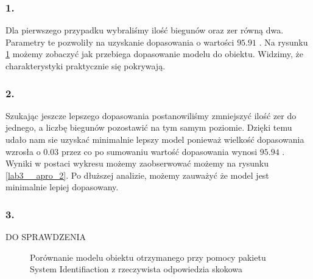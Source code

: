 \subsubsection{1. }
Dla pierwszego przypadku wybraliśmy ilość biegunów oraz zer równą dwa. Parametry te pozwoliły na uzyskanie dopasowania o wartości $ \num{95.91} $ \text{\%}. Na rysunku \ref{lab3_apro_1} możemy zobaczyć jak przebiega dopasowanie modelu do obiektu. Widzimy, że charakterystyki praktycznie się pokrywają. 

\subsubsection{2. }
Szukając jeszcze lepszego dopasowania postanowiliśmy zmniejszyć ilość zer do jednego, a liczbę biegunów pozostawić na tym samym poziomie. Dzięki temu udało nam sie uzyskać minimalnie lepszy model ponieważ wielkość dopasowania wzrosła o $\num{0.03}$ \text{\%} przez co po sumowaniu wartość dopasowania wynosi $\num{95.94}$ \text{\%}. Wyniki w postaci wykresu możemy zaobserwować możemy na rysunku \ref{lab3__apro_2}. Po dłuższej analizie, możemy zauważyć że model jest minimalnie lepiej dopasowany. 
\subsubsection{3. }
DO SPRAWDZENIA 
\begin{figure}[t]
    \centering
    \caption{Porównanie modelu obiektu otrzymanego przy pomocy pakietu System Identifiaction
z rzeczywista odpowiedzia skokowa}
    \label{lab3_apro_1}
\end{figure}

